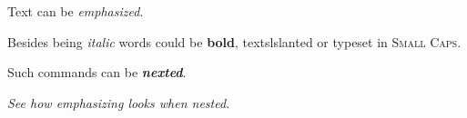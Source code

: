 \documentclass{article}
\begin{document}
Text can be \emph{emphasized}.

Besides being \textit{italic} words could be \textbf{bold}, textsl{slanted} or typeset in \textsc{Small Caps}.

Such commands can be \textit{\textbf{nexted}}.

\emph{See how \emph{emphasizing} looks when nested.}
\end{document}
